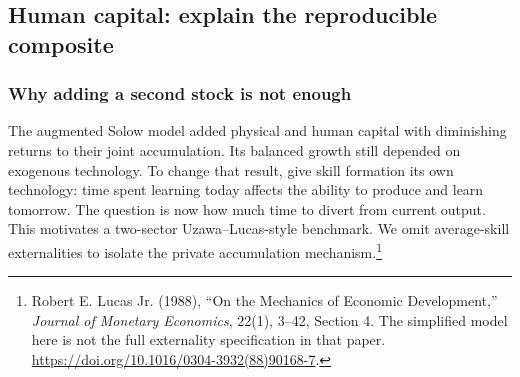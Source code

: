 \subsection{Human capital: explain the reproducible composite}

\subsubsection{Why adding a second stock is not enough}

The augmented Solow model added physical and human capital with diminishing
returns to their joint accumulation. Its balanced growth still depended on
exogenous technology. To change that result, give skill formation its own
technology: time spent learning today affects the ability to produce and learn
tomorrow. The question is now how much time to divert from current output.
This motivates a two-sector Uzawa--Lucas-style benchmark. We omit average-skill
externalities to isolate the private accumulation mechanism.\footnote{Robert
E. Lucas Jr. (1988), ``On the Mechanics of Economic Development,''
\textit{Journal of Monetary Economics}, 22(1), 3--42, Section 4.
The simplified model here is not the full externality specification in that
paper. \url{https://doi.org/10.1016/0304-3932(88)90168-7}.}

